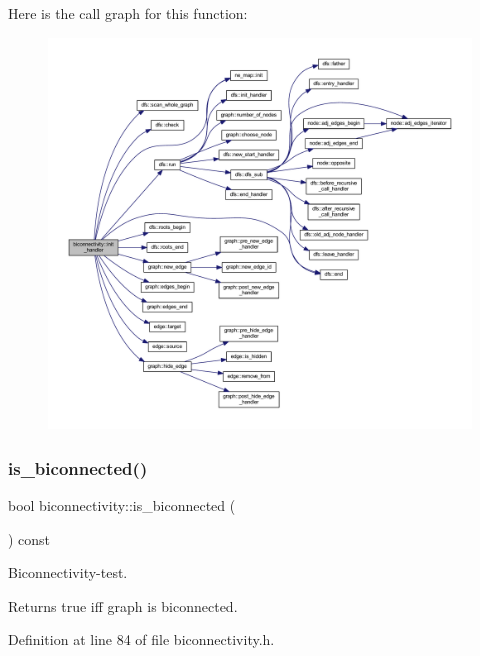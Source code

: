 Here is the call graph for this function\+:\nopagebreak
\begin{figure}[H]
\begin{center}
\leavevmode
\includegraphics[width=350pt]{classbiconnectivity_a64adab869e0080e3a1f8479e70010317_cgraph}
\end{center}
\end{figure}
\mbox{\label{classbiconnectivity_a50e7cee997b6d56ccbb9ae3fd039d9cd}} 
\subsubsection{\texorpdfstring{is\+\_\+biconnected()}{is\_biconnected()}}
{\footnotesize\ttfamily bool biconnectivity\+::is\+\_\+biconnected (\begin{DoxyParamCaption}{ }\end{DoxyParamCaption}) const\hspace{0.3cm}{\ttfamily [inline]}}



Biconnectivity-\/test. 

\begin{DoxyReturn}{Returns}
true iff graph is biconnected. 
\end{DoxyReturn}


Definition at line 84 of file biconnectivity.\+h.


